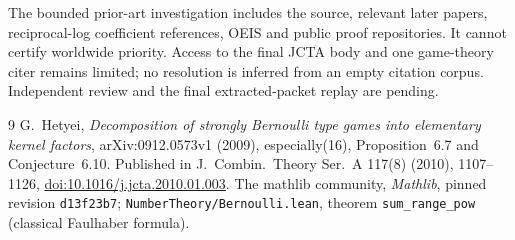 \documentclass[11pt]{article}
\begin{document}
The bounded prior-art investigation includes the source, relevant later
papers, reciprocal-log coefficient references, OEIS and public proof
repositories. It cannot certify worldwide priority. Access to the final
JCTA body and one game-theory citer remains limited; no resolution is
inferred from an empty citation corpus. Independent review and the final
extracted-packet replay are pending.

\begin{thebibliography}{9}
 G.~Hetyei, \emph{Decomposition of strongly Bernoulli type games
into elementary kernel factors}, arXiv:0912.0573v1 (2009), especially(16),
Proposition~6.7 and Conjecture~6.10. Published in J.~Combin.~Theory Ser.~A
117(8) (2010), 1107--1126, \href{https://doi.org/10.1016/j.jcta.2010.01.003}{doi:10.1016/j.jcta.2010.01.003}.
 The mathlib community, \emph{Mathlib}, pinned revision
\texttt{d13f23b7}; \texttt{NumberTheory/Bernoulli.lean},
theorem \texttt{sum\_range\_pow} (classical Faulhaber formula).
\end{thebibliography}
\end{document}
